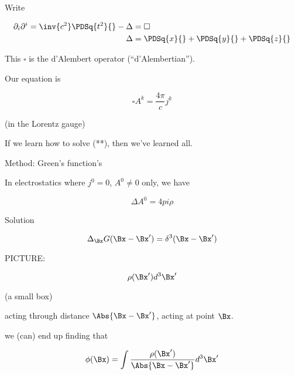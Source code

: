 Write

\begin{align}\label{eqn:relativisticElectrodynamicsL17:n}
\partial_i \partial^i = \inv{c^2} \PDSq{t^2}{} - \Delta &= \square \\
\Delta &= \PDSq{x}{} + \PDSq{y}{} + \PDSq{z}{}
\end{align}

This $\square$ is the d'Alembert operator (``d'Alembertian'').

Our equation is 

\begin{equation}\label{eqn:relativisticElectrodynamicsL17:n}
\square A^k = \frac{4 \pi}{c} j^k
\end{equation}

(in the Lorentz gauge)

If we learn how to solve (**), then we've learned all.

Method: Green's function's

In electrostatics where $j^0 = 0$, $A^0 \ne 0$ only, we have

\begin{equation}\label{eqn:relativisticElectrodynamicsL17:n}
\Delta A^0 = 4 pi \rho
\end{equation}

Solution 

\begin{equation}\label{eqn:relativisticElectrodynamicsL17:n}
\Delta_{\Bx} G(\Bx - \Bx') = \delta^3( \Bx - \Bx')
\end{equation}

PICTURE: 

\begin{equation}\label{eqn:relativisticElectrodynamicsL17:n}
\rho(\Bx') d^3 \Bx'
\end{equation}

(a small box)

acting through distance $\Abs{\Bx - \Bx'}$, acting at point $\Bx$.

we (can) end up finding that 

\begin{equation}\label{eqn:relativisticElectrodynamicsL17:n}
\phi(\Bx) = \int \frac{\rho(\Bx')}{\Abs{\Bx - \Bx'}} d^3 \Bx'
\end{equation}

\EndArticle
